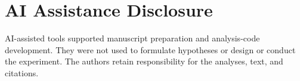 \documentclass[sigconf,anonymous]{aamas}
\begin{document}
\section*{AI Assistance Disclosure}

AI-assisted tools supported manuscript preparation and analysis-code development. They were not used to formulate hypotheses or design or conduct the experiment. The authors retain responsibility for the analyses, text, and citations.



\end{document}
